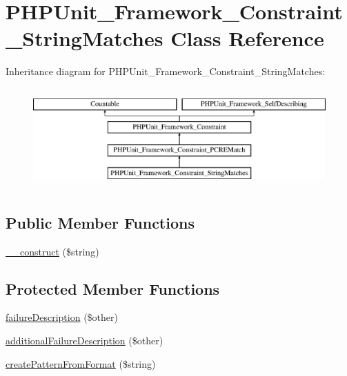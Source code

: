 \hypertarget{class_p_h_p_unit___framework___constraint___string_matches}{}\section{P\+H\+P\+Unit\+\_\+\+Framework\+\_\+\+Constraint\+\_\+\+String\+Matches Class Reference}
\label{class_p_h_p_unit___framework___constraint___string_matches}
Inheritance diagram for P\+H\+P\+Unit\+\_\+\+Framework\+\_\+\+Constraint\+\_\+\+String\+Matches\+:\begin{figure}[H]
\begin{center}
\leavevmode
\includegraphics[height=3.888889cm]{class_p_h_p_unit___framework___constraint___string_matches}
\end{center}
\end{figure}
\subsection*{Public Member Functions}
\begin{DoxyCompactItemize}
\item 
\mbox{\hyperlink{class_p_h_p_unit___framework___constraint___string_matches_a86d355bfc3694145c81bf7ba65d3cded}{\+\_\+\+\_\+construct}} (\$string)
\end{DoxyCompactItemize}
\subsection*{Protected Member Functions}
\begin{DoxyCompactItemize}
\item 
\mbox{\hyperlink{class_p_h_p_unit___framework___constraint___string_matches_aaabb679273bfb812df4d81c283754a59}{failure\+Description}} (\$other)
\item 
\mbox{\hyperlink{class_p_h_p_unit___framework___constraint___string_matches_ac90d1ef6c5737c595b1a8b1f3d3b230b}{additional\+Failure\+Description}} (\$other)
\item 
\mbox{\hyperlink{class_p_h_p_unit___framework___constraint___string_matches_ac2eec2837817206f470769150cfc6e3e}{create\+Pattern\+From\+Format}} (\$string)
\end{DoxyCompactItemize}
